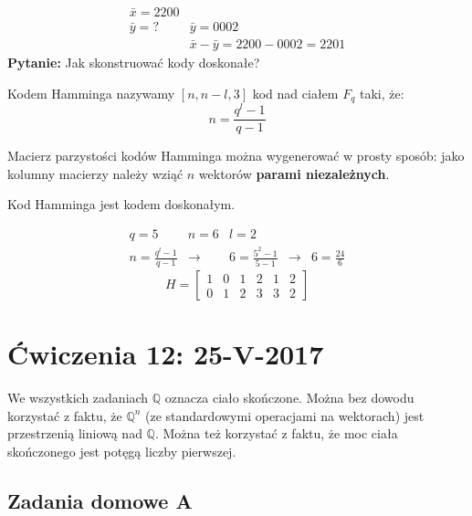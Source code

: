 \begin{align*}
\bar{x}=2200\\
\bar{y}=? &\bar{y}=0002\\
&\bar{x}-\bar{y}=2200-0002=2201
\end{align*}
\textbf{Pytanie:} Jak skonstruować kody doskonałe?
\begin{definition}
Kodem Hamminga nazywamy $[n, n-l, 3]$ kod nad ciałem $F_q$ taki, że: $$n=\frac{q^l-1}{q-1}$$

Macierz parzystości kodów Hamminga można wygenerować w prosty sposób: jako kolumny macierzy należy wziąć $n$ wektorów \textbf{parami niezależnych}.
\end{definition}
\begin{fact}
Kod Hamminga jest kodem doskonałym.
\end{fact}
\begin{example*}
\begin{align*}
q=5 & n=6 &l=2 \\
n=\frac{q^l-1}{q-1} & \rightarrow & 6=\frac{5^2-1}{5-1} &\rightarrow &6=\frac{24}{6}
\end{align*}
$$H=\begin{bmatrix}
1&0&1&2&1&2\\0&1&2&3&3&2
\end{bmatrix}$$

\end{example*}
 

\section{Ćwiczenia 12: 25-V-2017}
We wszystkich zadaniach $\mathbb{Q}$ oznacza ciało skończone. Można bez dowodu korzystać z faktu, że $\mathbb{Q}^n$ (ze standardowymi operacjami na wektorach) jest przestrzenią liniową nad $\mathbb{Q}$. Można też korzystać z faktu, że moc ciała skończonego jest potęgą liczby pierwszej.

\subsection{Zadania domowe A}
